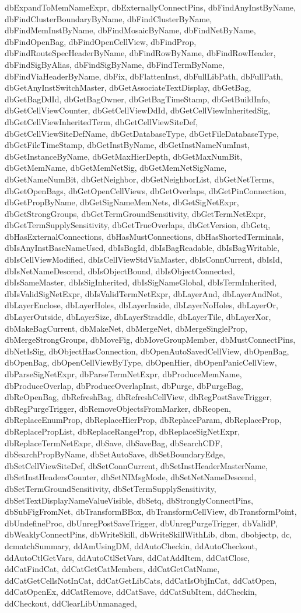 {{dbExpandToMemNameExpr, dbExternallyConnectPins, dbFindAnyInstByName, dbFindClusterBoundaryByName, dbFindClusterByName, dbFindMemInstByName, dbFindMosaicByName, dbFindNetByName, dbFindOpenBag, dbFindOpenCellView, dbFindProp, dbFindRouteSpecHeaderByName, dbFindRowByName, dbFindRowHeader, dbFindSigByAlias, dbFindSigByName, dbFindTermByName, dbFindViaHeaderByName, dbFix, dbFlattenInst, dbFullLibPath, dbFullPath, dbGetAnyInstSwitchMaster, dbGetAssociateTextDisplay, dbGetBag, dbGetBagDdId, dbGetBagOwner, dbGetBagTimeStamp, dbGetBuildInfo, dbGetCellViewCounter, dbGetCellViewDdId, dbGetCellViewInheritedSig, dbGetCellViewInheritedTerm, dbGetCellViewSiteDef, dbGetCellViewSiteDefName, dbGetDatabaseType, dbGetFileDatabaseType, dbGetFileTimeStamp, dbGetInstByName, dbGetInstNameNumInst, dbGetInstanceByName, dbGetMaxHierDepth, dbGetMaxNumBit, dbGetMemName, dbGetMemNetSig, dbGetMemNetSigName, dbGetNameNumBit, dbGetNeighbor, dbGetNeighborList, dbGetNetTerms, dbGetOpenBags, dbGetOpenCellViews, dbGetOverlaps, dbGetPinConnection, dbGetPropByName, dbGetSigNameMemNets, dbGetSigNetExpr, dbGetStrongGroups, dbGetTermGroundSensitivity, dbGetTermNetExpr, dbGetTermSupplySensitivity, dbGetTrueOverlaps, dbGetVersion, dbGetq, dbHasExternalConnections, dbHasMustConnections, dbHasShortedTerminals, dbIsAnyInstBaseNameUsed, dbIsBagId, dbIsBagReadable, dbIsBagWritable, dbIsCellViewModified, dbIsCellViewStdViaMaster, dbIsConnCurrent, dbIsId, dbIsNetNameDescend, dbIsObjectBound, dbIsObjectConnected, dbIsSameMaster, dbIsSigInherited, dbIsSigNameGlobal, dbIsTermInherited, dbIsValidSigNetExpr, dbIsValidTermNetExpr, dbLayerAnd, dbLayerAndNot, dbLayerEnclose, dbLayerHoles, dbLayerInside, dbLayerNoHoles, dbLayerOr, dbLayerOutside, dbLayerSize, dbLayerStraddle, dbLayerTile, dbLayerXor, dbMakeBagCurrent, dbMakeNet, dbMergeNet, dbMergeSingleProp, dbMergeStrongGroups, dbMoveFig, dbMoveGroupMember, dbMustConnectPins, dbNetIsSig, dbObjectHasConnection, dbOpenAutoSavedCellView, dbOpenBag, dbOpenBag, dbOpenCellViewByType, dbOpenHier, dbOpenPanicCellView, dbParseSigNetExpr, dbParseTermNetExpr, dbProduceMemName, dbProduceOverlap, dbProduceOverlapInst, dbPurge, dbPurgeBag, dbReOpenBag, dbRefreshBag, dbRefreshCellView, dbRegPostSaveTrigger, dbRegPurgeTrigger, dbRemoveObjectsFromMarker, dbReopen, dbReplaceEnumProp, dbReplaceHierProp, dbReplaceParam, dbReplaceProp, dbReplacePropList, dbReplaceRangeProp, dbReplaceSigNetExpr, dbReplaceTermNetExpr, dbSave, dbSaveBag, dbSearchCDF, dbSearchPropByName, dbSetAutoSave, dbSetBoundaryEdge, dbSetCellViewSiteDef, dbSetConnCurrent, dbSetInstHeaderMasterName, dbSetInstHeadersCounter, dbSetNIMsgMode, dbSetNetNameDescend, dbSetTermGroundSensitivity, dbSetTermSupplySensitivity, dbSetTextDisplayNameValueVisible, dbSetq, dbStronglyConnectPins, dbSubFigFromNet, dbTransformBBox, dbTransformCellView, dbTransformPoint, dbUndefineProc, dbUnregPostSaveTrigger, dbUnregPurgeTrigger, dbValidP, dbWeaklyConnectPins, dbWriteSkill, dbWriteSkillWithLib, dbm, dbobjectp, dc, dcmatchSummary, ddAmUsingDM, ddAutoCheckin, ddAutoCheckout, ddAutoCtlGetVars, ddAutoCtlSetVars, ddCatAddItem, ddCatClose, ddCatFindCat, ddCatGetCatMembers, ddCatGetCatName, ddCatGetCellsNotInCat, ddCatGetLibCats, ddCatIsObjInCat, ddCatOpen, ddCatOpenEx, ddCatRemove, ddCatSave, ddCatSubItem, ddCheckin, ddCheckout, ddClearLibUnmanaged, }}
